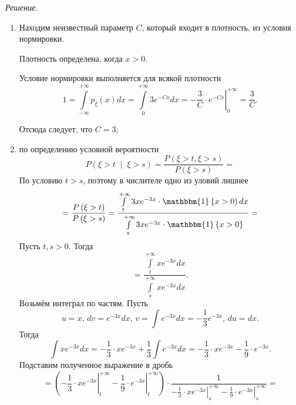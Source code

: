 \textit{Решение.}
\begin{enumerate}[label=\alph*)]
  \item Находим неизвестный параметр $C$, который входит в плотность,
  из условия нормировки.

  Плотность определена, когда $x > 0$.

  Условие нормировки выполняется для всякой плотности
  \begin{equation*}
    1 =
    \int \limits_{-\infty }^{+\infty } p_{ \xi } \left( x \right) dx =
    \int \limits_0^{+\infty } 3e^{-Cx} dx =
    \left. -\frac{3}{C} \cdot e^{-Cx} \right|_0^{+\infty } =
    \frac{3}{C}.
  \end{equation*}

  Отсюда следует, что $C = 3$;
  \item по определению условной вероятности
  \begin{equation*}
    P \left( \xi > t \; \middle| \; \xi > s \right) =
    \frac{P \left( \xi > t, \xi > s \right) }{P \left( \xi > s \right) } =
  \end{equation*}
  По условию $t > s$, поэтому в числителе одно из уловий лишнее
  \begin{equation*}
    = \frac{P \left( \xi > t \right) }{P \left( \xi > s \right) } =
    \frac{ \int \limits_t^{+\infty } 3xe^{-3x} \cdot \mathbbm{1} \left\{ x > 0 \right) dx}{ \int \limits_s^{+\infty } 3xe^{-3x} \cdot \mathbbm{1} \left\{ x > 0 \right\} } =
  \end{equation*}
  Пусть $t, s > 0$.
  Тогда
  \begin{equation*}
    = \frac{ \int \limits_t^{+\infty } xe^{-3x} dx}{ \int \limits_s^{+\infty } xe^{-3x} dx}.
  \end{equation*}
  Возьмём интеграл по частям.
  Пусть
  \begin{equation*}
    u = x, \,
    dv = e^{-3x} dx, \,
    v = \int e^{-3x} dx = - \frac{1}{3} e^{-3x}, \,
    du = dx.
  \end{equation*}
  Тогда
  \begin{equation*}
    \int xe^{-3x} dx =
    -\frac{1}{3} \cdot xe^{-3x} + \frac{1}{3} \int e^{-3x} dx =
    -\frac{1}{3} \cdot xe^{-3x} - \frac{1}{9} \cdot e^{-3x}.
  \end{equation*}
  Подставим полученное выражение в дробь
  \begin{equation*}
    = \left( \left. -\frac{1}{3} \cdot xe^{-3x} \right|_t^{+\infty } - \left. \frac{1}{9} \cdot e^{-3x} \right|_t^{+\infty } \right) \cdot
    \frac{1}{ \left. -\frac{1}{3} \cdot xe^{-3x} \right|_s^{+\infty } - \left. \frac{1}{9} \cdot e^{-3x} \right|_s^{+\infty }} =

\end{equation*}
\end{enumerate}
